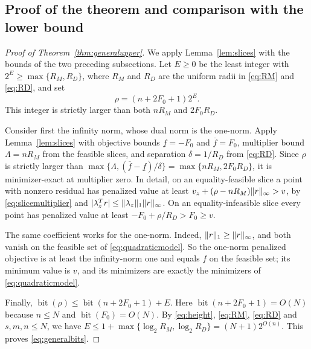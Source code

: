 \subsection{Proof of the theorem and comparison with the lower bound}
\begin{proof}[Proof of Theorem~\ref{thm:generalupper}]
We apply Lemma~\ref{lem:slices} with the bounds of the two preceding
subsections. Let $E\ge0$ be the least integer with
$2^E\ge\max\{R_M,R_D\}$, where $R_M$ and $R_D$ are the uniform radii in
\eqref{eq:RM} and \eqref{eq:RD}, and set
\begin{equation}\label{eq:sufficientrho}
 \rho=(n+2F_0+1)2^E.
\end{equation}
This integer is strictly larger than both $nR_M$ and $2F_0R_D$.

Consider first the infinity norm, whose dual norm is the one-norm. Apply
Lemma~\ref{lem:slices} with objective bounds
$\underline f=-F_0$ and $\overline f=F_0$, multiplier bound
$\Lambda=nR_M$ from the feasible slices, and separation
$\delta=1/R_D$ from \eqref{eq:RD}. Since $\rho$ is strictly larger than
$\max\{\Lambda,(\overline f-\underline f)/\delta\}=\max\{nR_M,2F_0R_D\}$,
it is minimizer-exact at multiplier zero. In detail, on an
equality-feasible slice a point with nonzero residual has penalized
value at least $v_z+(\rho-nR_M)\lVert r\rVert_\infty>v$, by
\eqref{eq:slicemultiplier} and
$|\lambda_z^Tr|\le\lVert\lambda_z\rVert_1\lVert r\rVert_\infty$. On an
equality-infeasible slice every point has penalized value at least
$-F_0+\rho/R_D>F_0\ge v$.

The same coefficient works for the one-norm. Indeed,
$\lVert r\rVert_1\ge\lVert r\rVert_\infty$, and both vanish on the feasible set of
\eqref{eq:quadraticmodel}. So the one-norm penalized objective is at
least the infinity-norm one and equals $f$ on the feasible set; its
minimum value is $v$, and its minimizers are exactly the minimizers of
\eqref{eq:quadraticmodel}.

Finally, $\operatorname{bit}(\rho)\le\operatorname{bit}(n+2F_0+1)+E$.
Here $\operatorname{bit}(n+2F_0+1)=O(N)$ because $n\le N$ and
$\operatorname{bit}(F_0)=O(N)$. By \eqref{eq:height}, \eqref{eq:RM},
\eqref{eq:RD} and $s,m,n\le N$, we have $E\le1+\max\{\log_2R_M,\log_2R_D\}
=(N+1)2^{O(n)}$. This proves \eqref{eq:generalbits}.
\end{proof}

